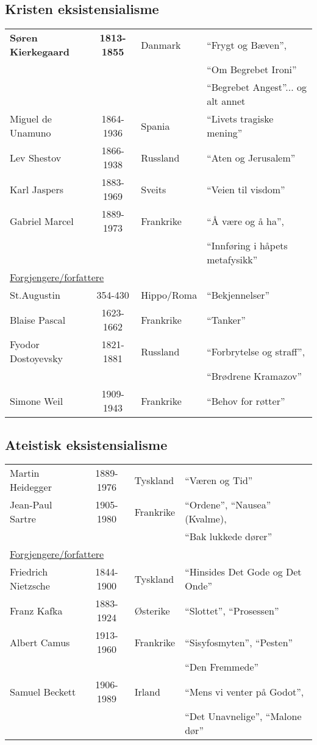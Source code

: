 \documentclass[12pt]{article}
\newcommand{\und}[1]{\underline{#1}}
\begin{document}
\subsection*{Kristen eksistensialisme}
%
\begin{tabular}{lcll}
{\bf S{\o}ren Kierkegaard} & {\bf 1813-1855} & Danmark & ``Frygt og B{\ae}ven'', \\
    & & & ``Om Begrebet Ironi'' \\
    & & & ``Begrebet Angest''... og alt annet \\
Miguel de Unamuno & 1864-1936 & Spania & ``Livets tragiske mening''\\
Lev Shestov & 1866-1938 & Russland & ``Aten og Jerusalem'' \\
Karl Jaspers & 1883-1969 & Sveits & ``Veien til visdom'' \\
Gabriel Marcel & 1889-1973 & Frankrike & ``{\AA} v{\ae}re og {\aa} ha'',\\
    & & & ``Innf{\o}ring i h{\aa}pets metafysikk'' \\ 
\multicolumn{3}{l}{\und{Forgjengere/forfattere}} \\
St.Augustin & 354-430 & Hippo/Roma  & ``Bekjennelser'' \\
Blaise Pascal & 1623-1662 & Frankrike & ``Tanker'' \\
Fyodor Dostoyevsky & 1821-1881 & Russland & ``Forbrytelse og straff'', \\
    & & & ``Br{\o}drene Kramazov''\\
Simone Weil & 1909-1943 & Frankrike & ``Behov for r{\o}tter''
\end{tabular}


\subsection*{Ateistisk eksistensialisme}
%
\noindent
\begin{tabular}{lcll}
Martin Heidegger & 1889-1976 & Tyskland & ``V{\ae}ren og Tid'' \\
Jean-Paul Sartre & 1905-1980 & Frankrike & ``Ordene'', ``Nausea'' (Kvalme),\\
  & & & ``Bak lukkede d{\o}rer''\\ 
\multicolumn{3}{l}{\und{Forgjengere/forfattere}} \\
Friedrich Nietzsche& 1844-1900 & Tyskland & ``Hinsides Det Gode og Det Onde''\\
Franz Kafka & 1883-1924 & {\O}sterike & ``Slottet'', ``Prosessen''\\
Albert Camus & 1913-1960 & Frankrike  & ``Sisyfosmyten'', ``Pesten''\\
   & & & ``Den Fremmede'' \\
Samuel Beckett & 1906-1989 & Irland & ``Mens vi venter p{\aa} Godot'', \\
   & & & ``Det Unavnelige'', ``Malone d{\o}r''
\end{tabular}
\end{document}
